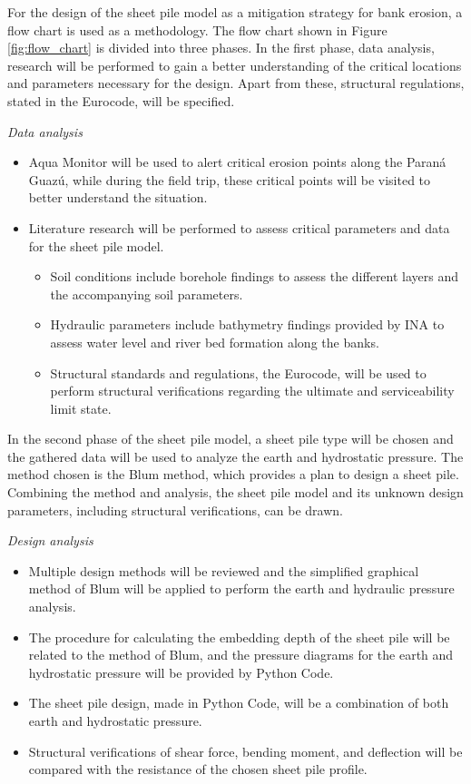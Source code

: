 For the design of the sheet pile model as a mitigation strategy for bank erosion, a flow chart is used as a methodology. The flow chart shown in Figure \ref{fig:flow_chart} is divided into three phases. In the first phase, data analysis, research will be performed to gain a better understanding of the critical locations and parameters necessary for the design. Apart from these, structural regulations, stated in the Eurocode, will be specified. 

\textit{Data analysis}

\begin{itemize}
    \item Aqua Monitor will be used to alert critical erosion points along the Paraná Guazú, while during the field trip, these critical points will be visited to better understand the situation.
    \item Literature research will be performed to assess critical parameters and data for the sheet pile model.
    \begin{itemize}
        \item Soil conditions include borehole findings to assess the different layers and the accompanying soil parameters.
        \item Hydraulic parameters include bathymetry findings provided by INA to assess water level and river bed formation along the banks.
        \item Structural standards and regulations, the Eurocode, will be used to perform structural verifications regarding the ultimate and serviceability limit state.
    \end{itemize}
\end{itemize}   

In the second phase of the sheet pile model, a sheet pile type will be chosen and the gathered data will be used to analyze the earth and hydrostatic pressure. The method chosen is the Blum method, which provides a plan to design a sheet pile. Combining the method and analysis, the sheet pile model and its unknown design parameters, including structural verifications, can be drawn. 

\textit{Design analysis}

\begin{itemize}
    \item Multiple design methods will be reviewed and the simplified graphical method of Blum will be applied to perform the earth and hydraulic pressure analysis.
    \item The procedure for calculating the embedding depth of the sheet pile will be related to the method of Blum, and the pressure diagrams for the earth and hydrostatic pressure will be provided by Python Code.
    \item The sheet pile design, made in Python Code, will be a combination of both earth and hydrostatic pressure.
    \item Structural verifications of shear force, bending moment, and deflection will be compared with the resistance of the chosen sheet pile profile.
\end{itemize}

